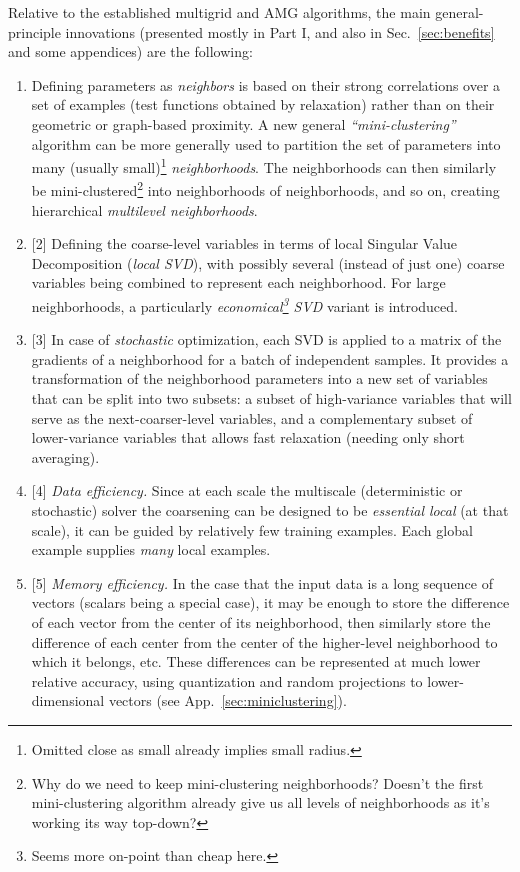 \documentclass{article} %
\begin{document}
Relative to the established multigrid and AMG algorithms, the main general-principle innovations (presented mostly in Part I, and also in Sec.~\ref{sec:benefits} and some appendices) are the following:
\begin{enumerate}
    \item[(1)] Defining parameters as {\it neighbors} is based on their strong correlations over a set of examples (test functions obtained by relaxation) rather than on their geometric or graph-based proximity. A new general {\it ``mini-clustering''} algorithm can be more generally used to partition the set of parameters into many (usually small)\footnote{Omitted close as small already implies small radius.} {\it neighborhoods}. The neighborhoods can then similarly be mini-clustered\footnote{Why do we need to keep mini-clustering neighborhoods? Doesn't the first mini-clustering algorithm already give us all levels of neighborhoods as it's working its way top-down?} into neighborhoods of neighborhoods, and so on, creating hierarchical {\it multilevel neighborhoods}.
    \item{[2]} Defining the coarse-level variables in terms of local Singular Value Decomposition ({\it local SVD}), with possibly several (instead of just one) coarse variables being combined to represent each neighborhood. For large neighborhoods, a particularly {\it economical\footnote{Seems more on-point than cheap here.} SVD} variant is introduced.
    \item{[3]} In case of {\it stochastic} optimization, each SVD is applied to a matrix of the gradients of a neighborhood for a batch of independent samples. It provides a transformation of the neighborhood parameters into a new set of variables that can be split into two subsets: a subset of high-variance variables that will serve as the next-coarser-level variables, and a complementary subset of lower-variance variables that allows fast relaxation (needing only short averaging).
    \item{[4]} {\it Data efficiency.} Since at each scale the multiscale (deterministic or stochastic) solver the coarsening can be designed to be {\it essential local} (at that scale), it can be guided by relatively few training examples. Each global example supplies {\it many} local examples.
    \item{[5]} {\it Memory efficiency.} In the case that the input data is a long sequence of vectors (scalars being a special case), it may be enough to store the difference of each vector from the center of its neighborhood, then similarly store the difference of each center from the center of the higher-level neighborhood to which it belongs, etc. These differences can be represented at much lower relative accuracy, using quantization and random projections to lower-dimensional vectors (see App.~\ref{sec:miniclustering}).

\end{enumerate}
\end{document}
